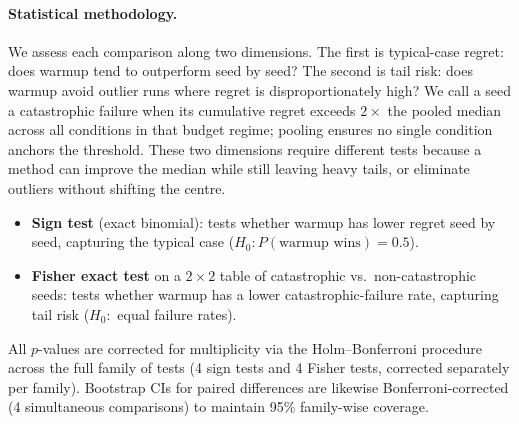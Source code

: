 \paragraph{Statistical methodology.}
We assess each comparison along two dimensions.
The first is typical-case regret: does warmup tend to outperform
seed by seed?
The second is tail risk: does warmup avoid outlier runs where regret
is disproportionately high?
We call a seed a catastrophic failure when its cumulative regret
exceeds $2{\times}$ the pooled median across all conditions in that
budget regime; pooling ensures no single condition anchors the
threshold.
These two dimensions require different tests because a method can
improve the median while still leaving heavy tails, or eliminate
outliers without shifting the centre.
\begin{itemize}[nosep,leftmargin=*]
  \item \textbf{Sign test} (exact binomial): tests whether warmup
    has lower regret seed by seed, capturing the typical case
    ($H_0\colon P(\text{warmup wins}) = 0.5$).
  \item \textbf{Fisher exact test} on a $2{\times}2$ table of
    catastrophic vs.\ non-catastrophic seeds: tests whether warmup
    has a lower catastrophic-failure rate, capturing tail risk
    ($H_0\colon$ equal failure rates).
\end{itemize}
All $p$-values are corrected for multiplicity via the
Holm--Bonferroni procedure across the full family of tests
(4 sign tests and 4 Fisher tests, corrected separately per family).
Bootstrap CIs for paired differences are likewise
Bonferroni-corrected (4 simultaneous comparisons) to maintain 95\%
family-wise coverage.

